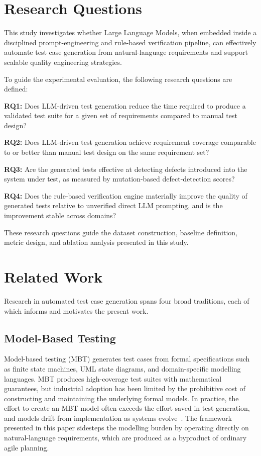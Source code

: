 \documentclass[conference]{IEEEtran}
\begin{document}
\section{Research Questions}
\label{sec:rq}

This study investigates whether Large Language Models, when embedded inside a disciplined prompt-engineering and rule-based verification pipeline, can effectively automate test case generation from natural-language requirements and support scalable quality engineering strategies.

To guide the experimental evaluation, the following research questions are defined:

\textbf{RQ1:} Does LLM-driven test generation reduce the time required to produce a validated test suite for a given set of requirements compared to manual test design?

\textbf{RQ2:} Does LLM-driven test generation achieve requirement coverage comparable to or better than manual test design on the same requirement set?

\textbf{RQ3:} Are the generated tests effective at detecting defects introduced into the system under test, as measured by mutation-based defect-detection scores?

\textbf{RQ4:} Does the rule-based verification engine materially improve the quality of generated tests relative to unverified direct LLM prompting, and is the improvement stable across domains?

These research questions guide the dataset construction, baseline definition, metric design, and ablation analysis presented in this study.

\section{Related Work}
\label{sec:related_work}

Research in automated test case generation spans four broad traditions, each of which informs and motivates the present work.

\subsection{Model-Based Testing}

Model-based testing (MBT) generates test cases from formal specifications such as finite state machines, UML state diagrams, and domain-specific modelling languages. MBT produces high-coverage test suites with mathematical guarantees, but industrial adoption has been limited by the prohibitive cost of constructing and maintaining the underlying formal models. In practice, the effort to create an MBT model often exceeds the effort saved in test generation, and models drift from implementation as systems evolve~\cite{utting2012}. The framework presented in this paper sidesteps the modelling burden by operating directly on natural-language requirements, which are produced as a byproduct of ordinary agile planning.
\end{document}
